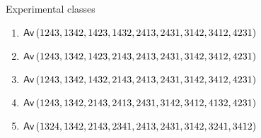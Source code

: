 \begin{frame}{Experimental classes}
    \begin{enumerate}
    \item $\textsf{Av}\left(1243,1342,1423,1432,2413,2431,3142,3412,4231\right)$
    \item $\textsf{Av}\left(1243,1342,1423,2143,2413,2431,3142,3412,4231\right)$
    \item $\textsf{Av}\left(1243,1342,1432,2143,2413,2431,3142,3412,4231\right)$
    \item $\textsf{Av}\left(1243,1342,2143,2413,2431,3142,3412,4132,4231\right)$
    \item $\textsf{Av}\left(1324,1342,2143,2341,2413,2431,3142,3241,3412\right)$
    \end{enumerate}
\end{frame}